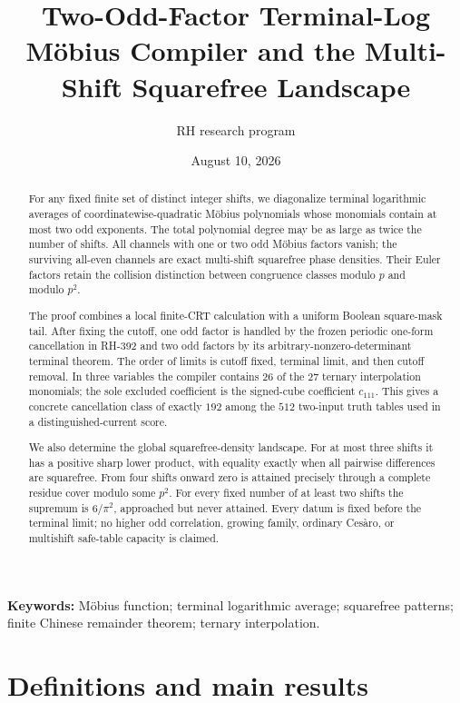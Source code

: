 \documentclass[11pt]{article}
\title{Two-Odd-Factor Terminal-Log M\"obius Compiler and the Multi-Shift Squarefree Landscape}
\author{RH research program}
\date{August 10, 2026}
\theoremstyle{definition}
\theoremstyle{remark}
\begin{document}
\maketitle

\begin{abstract}
For any fixed finite set of distinct integer shifts, we diagonalize terminal
logarithmic averages of coordinatewise-quadratic M\"obius polynomials whose
monomials contain at most two odd exponents.  The total polynomial degree may
be as large as twice the number of shifts.  All channels with one or two odd
M\"obius factors vanish; the surviving all-even channels are exact
multi-shift squarefree phase densities.  Their Euler factors retain the
collision distinction between congruence classes modulo \(p\) and modulo
\(p^2\).

The proof combines a local finite-CRT calculation with a uniform Boolean
square-mask tail.  After fixing the cutoff, one odd factor is handled by the
frozen periodic one-form cancellation in RH-392 and two odd factors by its
arbitrary-nonzero-determinant terminal theorem.  The order of limits is
cutoff fixed, terminal limit, and then cutoff removal.  In three variables
the compiler contains \(26\) of the \(27\) ternary interpolation monomials;
the sole excluded coefficient is the signed-cube coefficient \(c_{111}\).
This gives a concrete cancellation class of exactly \(192\) among the
\(512\) two-input truth tables used in a distinguished-current score.

We also determine the global squarefree-density landscape.  For at most
three shifts it has a positive sharp lower product, with equality exactly
when all pairwise differences are squarefree.  From four shifts onward zero
is attained precisely through a complete residue cover modulo some
\(p^2\).  For every fixed number of at least two shifts the supremum is
\(6/\pi^2\), approached but never attained.  Every datum is fixed before the
terminal limit; no higher odd correlation, growing family, ordinary
Ces\`aro, or multishift safe-table capacity is claimed.
\end{abstract}

\noindent\textbf{Keywords:} M\"obius function; terminal logarithmic average;
squarefree patterns; finite Chinese remainder theorem; ternary interpolation.

\section{Definitions and main results}
\end{document}
